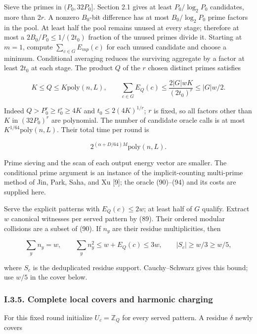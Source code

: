 Sieve the primes in \((P_0,32P_0]\). Section 2.1 gives at least \(P_0/\log_2P_0\) candidates, more than \(2r\). A nonzero \(B_0\)-bit difference has at most \(B_0/\log_2P_0\) prime factors in the pool. At least half the pool remains unused at every stage; therefore at most a \(2B_0/P_0\le1/(2t_0)\) fraction of the unused primes divide it. Starting at \(m=1\), compute \(\sum_{c\in G}E_{mp}(c)\) for each unused candidate and choose a minimum. Conditional averaging reduces the surviving aggregate by a factor at least \(2t_0\) at each stage. The product \(Q\) of the \(r\) chosen distinct primes satisfies

\[
K\le Q\le K\mathrm{poly}(n,L),\qquad
\sum_{c\in G}E_Q(c)
\le\frac{2|G|wK}{(2t_0)^r}\le |G|w/2.
\tag{96}
\]

Indeed \(Q>P_0^r\ge t_0^r\ge4K\) and \(t_0\le2(4K)^{1/r}\); \(r\) is fixed, so all factors other than \(K\) in \((32P_0)^r\) are polynomial. The number of candidate oracle calls is at most \(K^{1/64}\mathrm{poly}(n,L)\). Their total time per round is

\[
2^{(\alpha+D/64)M}\mathrm{poly}(n,L).
\tag{97}
\]

Prime sieving and the scan of each output energy vector are smaller. The conditional prime argument is an instance of the implicit-counting multi-prime method of Jin, Park, Saha, and Xu {[}9{]}; the oracle (90)--(94) and its costs are supplied here.

Serve the explicit patterns with \(E_Q(c)\le2w\); at least half of \(G\) qualify. Extract \(w\) canonical witnesses per served pattern by (89). Their ordered modular collisions are a subset of (90). If \(n_y\) are their residue multiplicities, then

\[
\sum_y n_y=w,\qquad
\sum_y n_y^2\le w+E_Q(c)\le3w,\qquad
|S_c|\ge w/3\ge w/5,
\tag{98}
\]

where \(S_c\) is the deduplicated residue support. Cauchy--Schwarz gives this bound; use \(w/5\) in the cover below.

\hypertarget{af-a9ec399514-i.3.5.-complete-local-covers-and-harmonic-charging}{%
\subsubsection{I.3.5. Complete local covers and harmonic charging}\label{af-a9ec399514-i.3.5.-complete-local-covers-and-harmonic-charging}}

For this fixed round initialize \(U_c=\mathbb Z_Q\) for every served pattern. A residue \(\delta\) newly covers


